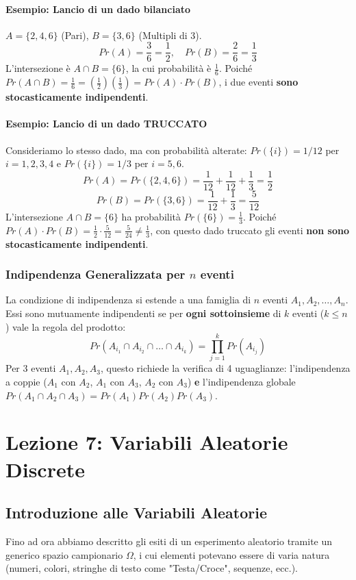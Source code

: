\documentclass[12pt, a4paper]{article}
\begin{document}
\paragraph{Esempio: Lancio di un dado bilanciato}
$A = \{2, 4, 6\}$ (Pari), $B = \{3, 6\}$ (Multipli di 3).
$$ Pr(A) = \frac{3}{6} = \frac{1}{2}, \quad Pr(B) = \frac{2}{6} = \frac{1}{3} $$
L'intersezione è $A \cap B = \{6\}$, la cui probabilità è $\frac{1}{6}$.
Poiché $Pr(A \cap B) = \frac{1}{6} = \left(\frac{1}{2}\right) \left(\frac{1}{3}\right) = Pr(A) \cdot Pr(B)$, i due eventi \textbf{sono stocasticamente indipendenti}.

\paragraph{Esempio: Lancio di un dado TRUCCATO}
Consideriamo lo stesso dado, ma con probabilità alterate: $Pr(\{i\}) = 1/12$ per $i=1,2,3,4$ e $Pr(\{i\}) = 1/3$ per $i=5,6$.
$$ Pr(A) = Pr(\{2,4,6\}) = \frac{1}{12} + \frac{1}{12} + \frac{1}{3} = \frac{1}{2} $$
$$ Pr(B) = Pr(\{3,6\}) = \frac{1}{12} + \frac{1}{3} = \frac{5}{12} $$
L'intersezione $A \cap B = \{6\}$ ha probabilità $Pr(\{6\}) = \frac{1}{3}$.
Poiché $Pr(A) \cdot Pr(B) = \frac{1}{2} \cdot \frac{5}{12} = \frac{5}{24} \neq \frac{1}{3}$, con questo dado truccato gli eventi \textbf{non sono stocasticamente indipendenti}.

\subsubsection{Indipendenza Generalizzata per \texorpdfstring{$n$}{n} eventi}
La condizione di indipendenza si estende a una famiglia di $n$ eventi $A_1, A_2, \dots, A_n$. Essi sono mutuamente indipendenti se per \textbf{ogni sottoinsieme} di $k$ eventi ($k \le n$) vale la regola del prodotto:
$$ Pr(A_{i_1} \cap A_{i_2} \cap \dots \cap A_{i_k}) = \prod_{j=1}^k Pr(A_{i_j}) $$
Per 3 eventi $A_1, A_2, A_3$, questo richiede la verifica di 4 uguaglianze: l'indipendenza a coppie ($A_1$ con $A_2$, $A_1$ con $A_3$, $A_2$ con $A_3$) \textbf{e} l'indipendenza globale $Pr(A_1 \cap A_2 \cap A_3) = Pr(A_1)Pr(A_2)Pr(A_3)$.

\section{Lezione 7: Variabili Aleatorie Discrete}

\subsection{Introduzione alle Variabili Aleatorie}
Fino ad ora abbiamo descritto gli esiti di un esperimento aleatorio tramite un generico spazio campionario $\Omega$, i cui elementi potevano essere di varia natura (numeri, colori, stringhe di testo come "Testa/Croce", sequenze, ecc.). 
\end{document}
